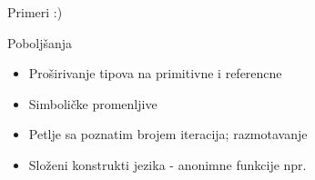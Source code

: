 \begin{frame}{Primeri}
    \centering
    :)
\end{frame}

\begin{frame}{Pobolj\v{s}anja}
    \begin{itemize}
        \item Pro\v{s}irivanje tipova na primitivne i referencne
        \item Simboli\v{c}ke promenljive
        \item Petlje sa poznatim brojem iteracija; razmotavanje
        \item Slo\v{z}eni konstrukti jezika - anonimne funkcije npr.
    \end{itemize}
\end{frame}
